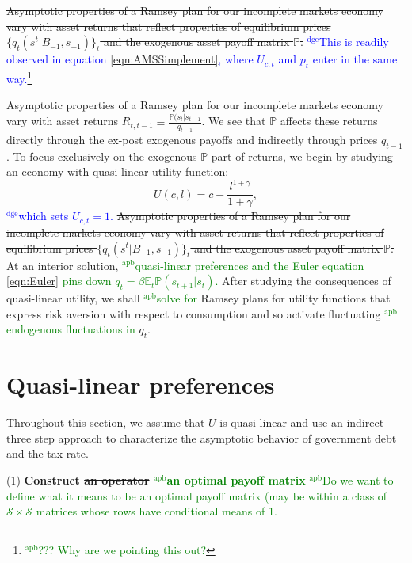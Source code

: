 \documentclass[12pt]{article}
\newcommand{\dge}[1]{\textcolor{blue}{$^{\textrm{dge}}${#1}}}
\newcommand{\apb}[1]{\textcolor{green}{$^{\textrm{apb}}${#1}}}
\begin{document}
\st{Asymptotic properties of a Ramsey plan for our incomplete markets economy vary  with   asset returns that reflect
	properties of equilibrium prices $\{q_t(s^t|B_{-1},s_{-1})\}_t$ and the exogenous asset payoff matrix $\mathbb{P}$.}  \dge{This is readily observed in equation \eqref{eqn:AMSSimplement}, where $U_{c,t}$ and $p_t$ enter in the same way.\footnote{\apb{??? Why are we pointing this out?}}} 
	
Asymptotic properties of a Ramsey plan for our incomplete markets economy vary  with   asset returns $R_{t,t-1}\equiv \frac{\mathbb{P}(s_{t}|s_{t-1}}{q_{t-1}}$. We see that $\mathbb{P}$ affects these returns directly through the ex-post exogenous payoffs and indirectly through prices $q_{t-1}$. To focus exclusively on the exogenous $\mathbb{P}$ part of returns, we begin  by studying an economy with  quasi-linear  utility function:
  \begin{equation}\label{eqn:UQL}
U(c,l)=c-\frac{l^{1+\gamma}}{1+\gamma},\end{equation}\dge{which sets $U_{c,t}= 1$.}  \st{Asymptotic properties of a Ramsey plan for our incomplete markets economy vary  with   asset returns that reflect
	properties of equilibrium prices $\{q_t(s^t|B_{-1},s_{-1})\}_t$ and the exogenous asset payoff matrix $\mathbb{P}$.}  
At an interior solution, \apb{quasi-linear preferences and the Euler equation \eqref{eqn:Euler} pins down $q_t=\beta \mathbb{E}_t
\mathbb{P}(s_{t+1}|s_t)$.}  After studying the consequences of quasi-linear utility, we shall \apb{solve for }Ramsey plans for utility functions that express risk aversion with respect to consumption and so activate \st{fluctuating} \apb{endogenous fluctuations in }$q_t$.
	


\section{Quasi-linear preferences}

Throughout this section, we assume that $U$ is quasi-linear and use an indirect three step approach to  characterize  the asymptotic behavior of government  debt and the tax rate.



\noindent (1) \textbf{Construct  \st{an operator} \apb{an optimal payoff matrix}}
\apb{Do we want to define what it means to be an optimal payoff matrix (may be within a class of $\mathcal{S}\times\mathcal{S}$ matrices whose rows have conditional means of 1.}
\end{document}
